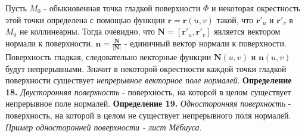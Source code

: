 \documentclass[12pt,a4paper]{article}
\begin{document}
	\newline
	\newline	
	Пусть $M_{0}$ - обыкновенная точка гладкой поверхности $\Phi$ и некоторая окрестность этой точки определена с помощью функции $\textbf{r} = \textbf{r}(u,v)$ такой, что $\textbf{r}'_{u}$ и $\textbf{r}'_{v}$ в $M_{0}$ не коллинеарны. Тогда очевидно, что $\textbf{N} = \left[ \textbf{r}'_{u} , \textbf{r}'_{v} \right]$ является вектором нормали к поверхности. $ \textbf{n} = \frac{\textbf{N}}{|\textbf{N}|} $ - единичный вектор нормали к поверхности.
	\newline
	Поверхность гладкая, следовательно векторные функции $\textbf{N}(u,v)$ и $\textbf{n}(u,v)$ будут непрерывными. Значит в некоторой окрестности каждой точки гладкой поверхности существует \textit{непрерывное векторное поле нормалей}.
	\newline
	\newline
	\textbf{Определение 18.} \textit{Двусторонняя поверхность} - поверхность, на которой в целом существует непрерывное поле нормалей.
	\newline
	\newline
	\textbf{Определение 19.} \textit{Односторонняя поверхность} - поверхность, на которой в целом не существует непрерывного поля нормалей.
	\newline
	\textit{Пример односторонней поверхности - лист Мёбиуса.}
		
	\newpage
\end{document}
